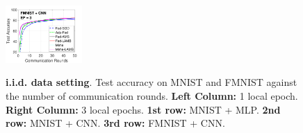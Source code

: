 \documentclass[nohyperref]{article}
\theoremstyle{plain}
\theoremstyle{definition}
\theoremstyle{remark}
\begin{document}
\begin{figure}[t]
\begin{center}
{        \hspace{-0.1in}\includegraphics[width=0.26\textwidth]{figure_mime/fmnist_testerror_cnn_ep3_iid1_mime.pdf}
        }
    \end{center}
	\caption{\textbf{i.i.d. data setting}. Test accuracy on MNIST and FMNIST against the number of communication rounds. \textbf{Left Column:} 1 local epoch. \textbf{Right Column:} 3 local epochs. \textbf{1st row:} MNIST + MLP. \textbf{2nd row:} MNIST + CNN. \textbf{3rd row:} FMNIST + CNN. 
	}
	\label{fig:iid}\vspace{-0.2in}
\end{figure}
\end{document}
